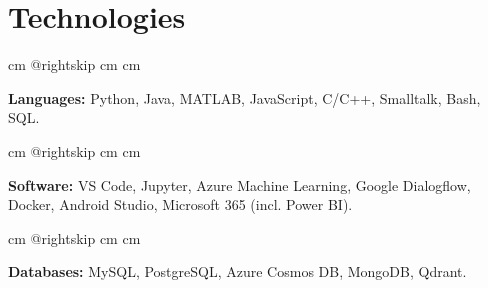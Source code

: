 \documentclass[10pt, letterpaper]{article}
\begin{document}
    
    \section{Technologies}

        \begingroup{} cm
        \advance\csname @rightskip cm
        \advance{} cm

        \textbf{Languages:} Python, Java, MATLAB, JavaScript, C/C++, Smalltalk, Bash, SQL. \par\endgroup

        \vspace{0.2 cm}
        \begingroup{} cm
        \advance\csname @rightskip cm
        \advance{} cm

        \textbf{Software:} VS Code, Jupyter, Azure Machine Learning, Google Dialogflow, Docker, Android Studio, Microsoft 365 (incl. Power BI). \par\endgroup

        \vspace{0.2 cm}
        \begingroup{} cm
        \advance\csname @rightskip cm
        \advance{} cm

        \textbf{Databases:} MySQL, PostgreSQL, Azure Cosmos DB, MongoDB, Qdrant. \par\endgroup


    
\end{document}
